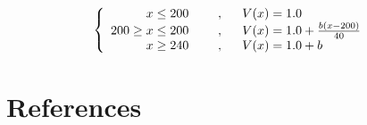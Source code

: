 \documentclass[a4paper,12pt,twoside]{article}
\begin{document}
\begin{equation}
\left\lbrace
\begin{array}{r c l} 
x \leq 200 &~~~~,~~& V(x) = 1.0 \\
200 \geq x \leq 200 &~~~~,~~& V(x) = 1.0 + \frac{b(x-200)}{40} \\
x \geq 240 &~~~~,~~& V(x) = 1.0 + b \\
\end{array}
\right.
\label{eq:PotVar:FormeMarche}
\end{equation}

\section{References}


\end{document}
